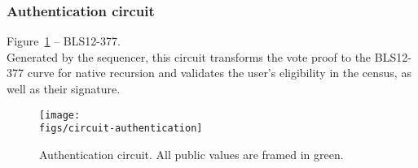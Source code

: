 \newpage
\subsubsection{Authentication circuit}

Figure~\ref{fig:circuit-authentication} -- BLS12-377.\\

\noi Generated by the sequencer, this circuit transforms the vote proof to the BLS12-377 curve for native recursion and validates the user's eligibility in the census, as well as their signature.


\begin{figure}[H]
	\centerline{\texttt{[image: \\figs/circuit-authentication]}}
	\caption{Authentication circuit. All public values are framed in green.}
	\label{fig:circuit-authentication}
\end{figure}

